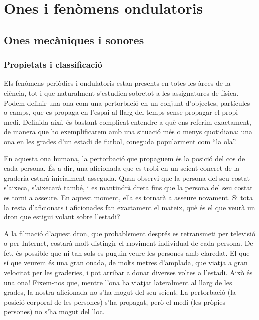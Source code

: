 \documentclass[12pt]{book}
\begin{document}


\part{Ones i fenòmens ondulatoris}

\chapter{Ones mecàniques i sonores}
\label{chap:OnesMecaniques}

\section{Propietats i classificació}

Els fenòmens periòdics i ondulatoris estan presents en totes les àrees de la ciència, tot i que naturalment s'estudien sobretot a les assignatures de física. Podem definir una ona com una pertorbació en un conjunt d'objectes, partícules o camps, que es propaga en l'espai al llarg del temps sense propagar el propi medi. Definida així, és bastant complicat entendre a què ens referim exactament, de manera que ho exemplificarem amb una situació més o menys quotidiana: una ona en les grades d'un estadi de futbol, coneguda popularment com ``la ola''.

En aquesta ona humana, la pertorbació que propaguem és la posició del cos de cada persona. És a dir, una aficionada que es trobi en un seient concret de la graderia estarà inicialment asseguda. Quan observi que la persona del seu costat s'aixeca, s'aixecarà també, i es mantindrà dreta fins que la persona del seu costat es torni a asseure. En aquest moment, ella es tornarà a asseure novament. Si tota la resta d'aficionats i aficionades fan exactament el mateix, què és el que veurà un dron que estigui volant sobre l'estadi?

A la filmació d'aquest dron, que probablement després es retransmeti per televisió o per Internet, costarà molt distingir el moviment individual de cada persona. De fet, és possible que ni tan sols es puguin veure les persones amb claredat. El que sí que veurem és una gran onada, de molts metres d'amplada, que viatja a gran velocitat per les graderies, i pot arribar a donar diverses voltes a l'estadi. Això és una ona! Fixem-nos que, mentre l'ona ha viatjat lateralment al llarg de les grades, la nostra aficionada no s'ha mogut del seu seient. La pertorbació (la posició corporal de les persones) s'ha propagat, però el medi (les pròpies persones) no s'ha mogut del lloc.
\end{document}
